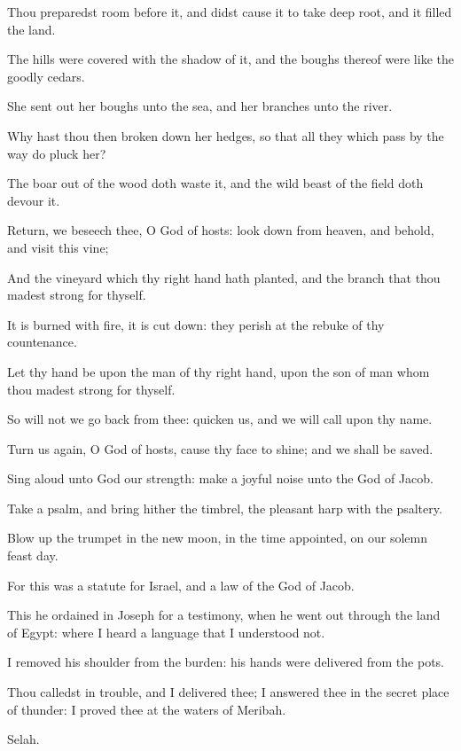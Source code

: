 \Verse Thou preparedst room before it, and didst cause it to take deep root, and it filled the land.

\Verse The hills were covered with the shadow of it, and the boughs thereof were like the goodly cedars.

\Verse She sent out her boughs unto the sea, and her branches unto the river.

\Verse Why hast thou then broken down her hedges, so that all they which pass by the way do pluck her?

\Verse The boar out of the wood doth waste it, and the wild beast of the field doth devour it.

\Verse Return, we beseech thee, O God of hosts: look down from heaven, and behold, and visit this vine;

\Verse And the vineyard which thy right hand hath planted, and the branch that thou madest strong for thyself.

\Verse It is burned with fire, it is cut down: they perish at the rebuke of thy countenance.

\Verse Let thy hand be upon the man of thy right hand, upon the son of man whom thou madest strong for thyself.

\Verse So will not we go back from thee: quicken us, and we will call upon thy name.

\Verse Turn us again, O \LORD God of hosts, cause thy face to shine; and we shall be saved.




\Chapter
\Verse Sing aloud unto God our strength: make a joyful noise unto the God of Jacob.

\Verse Take a psalm, and bring hither the timbrel, the pleasant harp with the psaltery.

\Verse Blow up the trumpet in the new moon, in the time appointed, on our solemn feast day.

\Verse For this was a statute for Israel, and a law of the God of Jacob.

\Verse This he ordained in Joseph for a testimony, when he went out through the land of Egypt: where I heard a language that I understood not.

\Verse I removed his shoulder from the burden: his hands were delivered from the pots.

\Verse Thou calledst in trouble, and I delivered thee; I answered thee in the secret place of thunder: I proved thee at the waters of Meribah.

Selah.

